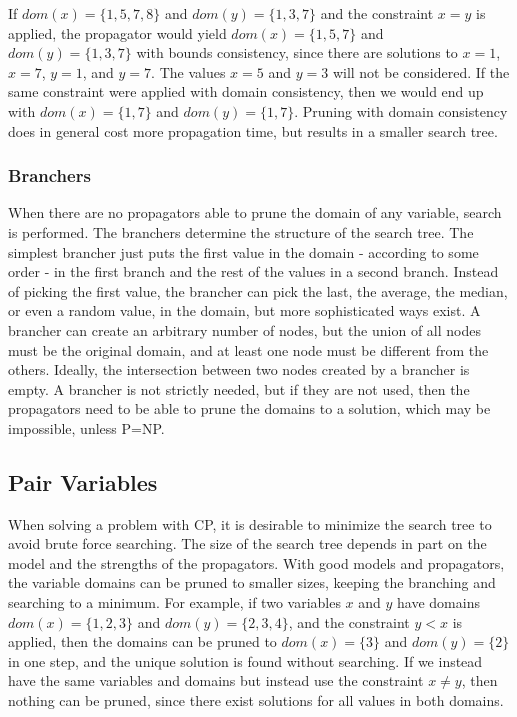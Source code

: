 \documentclass[a4paper,11pt]{article}
\begin{document}
If $\mathit{dom}(x)=\{1,5,7,8\}$ and $\mathit{dom}(y)=\{1,3,7\}$ and the constraint $x=y$ is applied, the propagator would yield $\mathit{dom}(x)=\{1,5,7\}$ and $\mathit{dom}(y)=\{1,3,7\}$ with bounds consistency, since there are solutions to $x=1$, $x=7$, $y=1$, and $y=7$. The values $x=5$ and $y=3$ will not be considered. If the same constraint were applied with domain consistency, then we would end up with $\mathit{dom}(x)=\{1,7\}$ and $\mathit{dom}(y)=\{1,7\}$. Pruning with domain consistency does in general cost more propagation time, but results in a smaller search tree.

\subsubsection{Branchers}
\label{sec:branchers}
When there are no propagators able to prune the domain of any variable, search is performed. The branchers determine the structure of the search tree. The simplest brancher just puts the first value in the domain - according to some order - in the first branch and the rest of the values in a second branch. Instead of picking the first value, the brancher can pick the last, the average, the median, or even a random value, in the domain, but more sophisticated ways exist. A brancher can create an arbitrary number of nodes, but the union of all nodes must be the original domain, and at least one node must be different from the others. Ideally, the intersection between two nodes created by a brancher is empty. A brancher is not strictly needed, but if they are not used, then the propagators need to be able to prune the domains to a solution, which may be impossible, unless P=NP.

\subsection{Pair Variables}
When solving a problem with CP, it is desirable to minimize the search tree to avoid brute force searching. The size of the search tree depends in part on the model and the strengths of the propagators. With good models and propagators, the variable domains can be pruned to smaller sizes, keeping the branching and searching to a minimum. For example, if two variables $x$ and $y$ have domains $\mathit{dom}(x)=\{1,2,3\}$ and $\mathit{dom}(y)=\{2,3,4\}$, and the constraint $y<x$ is applied, then the domains can be pruned to $\mathit{dom}(x)=\{3\}$ and $\mathit{dom}(y)=\{2\}$ in one step, and the unique solution is found without searching. If we instead have the same variables and domains but instead use the constraint $x\neq y$, then nothing can be pruned, since there exist solutions for all values in both domains.
\end{document}
